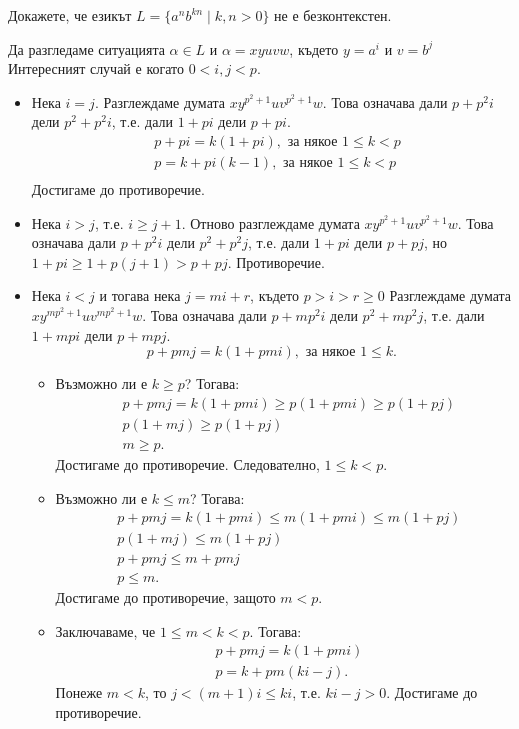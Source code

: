 \begin{problem}
  Докажете, че езикът $L = \{a^nb^{kn} \mid k,n > 0\}$ не е безконтекстен.
\end{problem}
\ifhints
\begin{hint}
  Да разгледаме ситуацията $\alpha \in L$ и
  $\alpha = xyuvw$, където $y = a^i$ и $v = b^j$
  Интересният случай е когато $0 < i,j < p$.
  \begin{itemize}
  \item 
    Нека $i = j$.
    Разглеждаме думата $xy^{p^2+1}uv^{p^2+1}w$.
    Това означава дали $p+p^2i$ дели $p^2+p^2i$, т.е.
    дали $1 + pi$ дели $p+pi$.
    \begin{align*}
      & p + pi = k(1+pi), \text{ за някое }1 \leq k < p\\
      & p = k + pi(k-1), \text{ за някое }1 \leq k < p\\
    \end{align*}
    Достигаме до противоречие.
  \item
    Нека $i > j$, т.е. $i \geq j+1$.
    Отново разглеждаме думата $xy^{p^2+1}uv^{p^2+1}w$.
    Това означава дали $p+p^2i$ дели $p^2+p^2j$, т.е.
    дали $1 + pi$ дели $p+pj$, но
    $1+pi \geq 1 + p(j+1) > p + pj$.
    Противоречие.
  \item
    Нека $i < j$ и тогава нека $j = mi + r$, където $p > i > r \geq 0$
    Разглеждаме думата $xy^{mp^2+1}uv^{mp^2+1}w$.
    Това означава дали $p+mp^2i$ дели $p^2+mp^2j$, т.е.
    дали $1 + mpi$ дели $p+mpj$.
    \[p+pmj = k(1+pmi), \text{ за някое }1 \leq k.\]
    \begin{itemize}
    \item 
      Възможно ли е $k \geq p$? Тогава:
      \begin{align*}
        & p + pmj = k(1+pmi) \geq p(1+pmi) \geq p(1+pj)\\
        & p(1+mj) \geq p(1+pj)\\
        & m \geq p.
      \end{align*}
      Достигаме до противоречие.
      Следователно, $1 \leq k < p$.
    \item
      Възможно ли е $k \leq m$? Тогава:
      \begin{align*}
        & p + pmj = k(1+pmi) \leq m(1+pmi) \leq m(1+pj)\\
        & p(1+mj) \leq m(1+pj)\\
        & p + pmj \leq m + pmj\\
        & p \leq m.
      \end{align*}
      Достигаме до противоречие, защото $m < p$.
    \item
      Заключаваме, че $1 \leq m < k < p$. Тогава:
      \begin{align*}
        & p + pmj = k(1+pmi)\\
        & p = k + pm(ki-j).
      \end{align*}
      Понеже $m < k$, то $j < (m+1)i \leq ki$,
      т.е. $ki-j > 0$. Достигаме до противоречие.
    \end{itemize}
  \end{itemize}
\end{hint}
\fi

